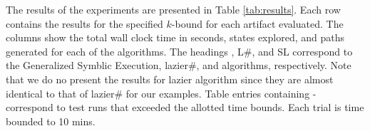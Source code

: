 \begin{table*} [t]
  \centering
  \caption{Comparing the efficiency of the summary heap appraoch to GSE and Lazier\# algorithms.}
  \label{tab:results}
\end{table*}


The results of the experiments are presented in Table
\ref{tab:results}. Each row contains the results for the specified $k$-bound 
for each artifact evaluated. The columns show the total
wall clock time in seconds, states explored, and paths generated for
each of the algorithms. The headings \gsetxt{}, L\#, and SL correspond
to the Generalized Symblic Execution, lazier\#, and \symtxt{}
algorithms, respectively. Note that we do no present the results for
lazier algorithm since they are almost identical to that of lazier\#
for our examples. Table entries containing - correspond to test runs
that exceeded the allotted time bounds. Each trial is time bounded to
10 mins.

